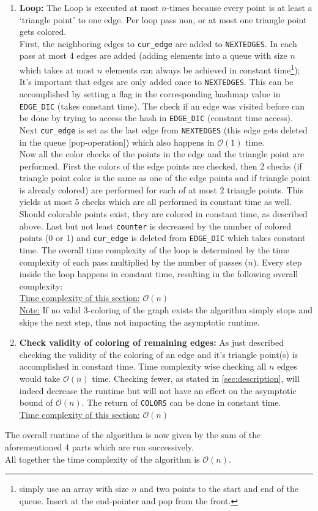 \documentclass[english]{scrartcl}
\newcommand{\code}{\texttt}
\begin{document}
\begin{enumerate}
    \item \textbf{Loop:} The Loop is executed at most $n$-times because every point is at least a \enquote*{triangle point} to one edge. Per loop pass non, or at most one triangle point gets colored. \\ First, the neighboring edges to \code{cur\_edge} are added to \code{NEXTEDGES}. In each pass at most 4 edges are added (adding elements into a queue with size $n$ which takes at most $n$ elements can always be achieved in constant time\footnote{simply use an array with size $n$ and two points to the start and end of the queue. Insert at the end-pointer and pop from the front.}); It's important that edges are only added once to \code{NEXTEDGES}. This can be accomplished by setting a flag in the corresponding hashmap value in \code{EDGE\_DIC} (takes constant time). The check if an edge was visited before can be done by trying to access the hash in \code{EDGE\_DIC} (constant time access). Next \code{cur\_edge} is set as the last edge from \code{NEXTEDGES} (this edge gets deleted in the queue [pop-operation]) which also happens in $\mathcal{O}(1)$ time.\\ Now all the color checks of the points in the edge and the triangle point are performed. First the colors of the edge points are checked, then 2 checks (if triangle point color is the same as one of the edge points and if triangle point is already colored) are performed for each of at most 2 triangle points. This yields at most 5 checks which are all performed in constant time as well. Should colorable points exist, they are colored in constant time, as described above. Last but not least \code{counter} is decreased by the number of colored points (0 or 1) and \code{cur\_edge} is deleted from \code{EDGE\_DIC} which takes constant time.    
    The overall time complexity of the loop is determined by the time complexity of each pass multiplied by the number of passes ($n$). Every step inside the loop happens in constant time, resulting in the following overall complexity:\\ \underline{Time complexity of this section:} $\mathcal{O}(n)$
    \\ \underline{Note:} If no valid 3-coloring of the graph exists the algorithm simply stops and skips the next step, thus not impacting the asymptotic runtime.
    \item \textbf{Check validity of coloring of remaining edges:} As just described checking the validity of the coloring of an edge and it's triangle point(s) is accomplished in constant time. Time complexity wise checking all $n$ edges would take $\mathcal{O}(n)$ time. Checking fewer, as stated in \autoref{sec:description}, will indeed decrease the runtime but will not have an effect on the asymptotic bound of $\mathcal{O}(n)$. The return of \code{COLORS} can be done in constant time. \\ \underline{Time complexity of this section:} $\mathcal{O}(n)$
\end{enumerate}
The overall runtime of the algorithm is now given by the sum of the aforementioned 4 parts which are run successively. \\
All together the time complexity of the algorithm is $\mathcal{O}(n)$. 
\end{document}
